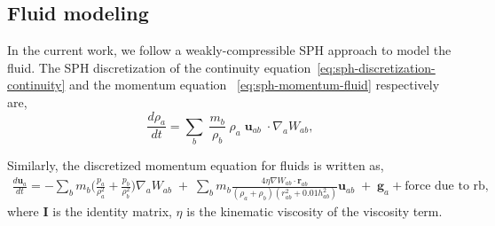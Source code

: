 \documentclass[preprint,12pt]{elsarticle}
\newcommand{\ten}[1]{\ensuremath{\mathbf{#1}}}
\begin{document}









\FloatBarrier%
\subsection{Fluid modeling}
\label{sec:fluid--modeling}

In the current work, we follow a weakly-compressible SPH approach to model the
fluid. The SPH discretization of the continuity
equation~\cref{eq:sph-discretization-continuity} and the momentum equation
~\cref{eq:sph-momentum-fluid} respectively are,
\begin{equation}
  \label{eq:sph-discretization-continuity}
  \frac{{d}\rho_a}{dt} = \sum_{b} \; \frac{m_b}{\rho_{b}} \;
  \rho_{a} \; {\ten{u}}_{ab} \; \cdot \nabla_{a} W_{ab},
\end{equation}

%
Similarly, the discretized momentum equation for fluids is written as,
\begin{multline}
  \label{eq:sph-momentum-fluid}
  \frac{{d}\ten{u}_{a}}{dt} = - \sum_{b} m_b
  \bigg(\frac{p_a}{\rho_a^2} + \frac{p_b}{\rho_b^2}\bigg)
  \nabla_{a} W_{ab}
 \;+\;
  \sum_{b} m_b \frac{4 \eta \nabla W_{ab}\cdot
    \ten{r}_{ab}}{(\rho_a + \rho_b) (r_{ab}^2 + 0.01 h_{ab}^2)} \ten{u}_{ab}  \;+\;
  \ten{g}_{a} + \text{force due to rb},
\end{multline}
where $\ten{I}$ is the identity matrix, $\eta$ is the kinematic viscosity of the
viscosity term.
\end{document}

